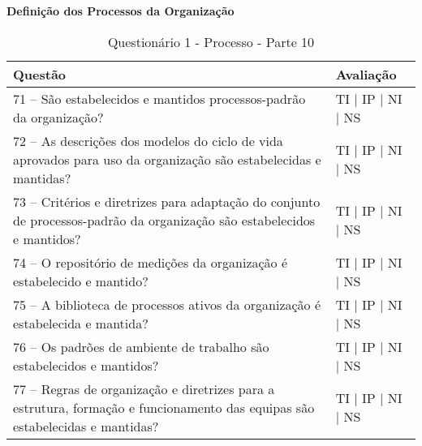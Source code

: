 \documentclass[openany,10pt,a4paper]{article}
\begin{document}
\begin{longtable}
\begin{appendix}
\begin{table}[h]
\textbf{Definição dos Processos da Organização}
	\centering
	\caption{Questionário 1 - Processo - Parte 10}
	\begin{tabular}{p{3.5in}p{2in}}		
		\toprule
		\textbf{Questão}  & \textbf{Avaliação}\\ 
		\midrule
		71 – São estabelecidos e mantidos processos-padrão da organização?
 & TI | IP | NI | NS \\
        \midrule
		72 – As descrições dos modelos do ciclo de vida aprovados para uso da organização são 
estabelecidas e mantidas?
 & TI | IP | NI | NS \\
		\midrule
		73 – Critérios e diretrizes para adaptação do conjunto de processos-padrão da organização são 
estabelecidos e mantidos?
 & TI | IP | NI | NS \\
		\midrule
        74 – O repositório de medições da organização é estabelecido e mantido?
 & TI | IP | NI | NS \\
		\midrule
		75 – A biblioteca de processos ativos da organização é estabelecida e mantida?
  & TI | IP | NI | NS \\
		\midrule
		76 – Os padrões de ambiente de trabalho são estabelecidos e mantidos?
 & TI | IP | NI | NS \\
        \midrule
        77 – Regras de organização e diretrizes para a estrutura, formação e funcionamento das equipas 
são estabelecidas e mantidas?
& TI | IP | NI | NS \\
		\bottomrule
	\end{tabular} 
	\label{tab:tabela1}
\end{table}


\end{appendix}
\end{longtable}
\end{document}
